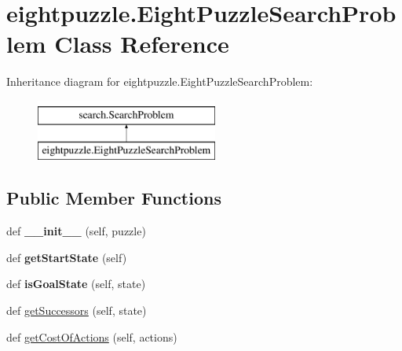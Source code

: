 \hypertarget{classeightpuzzle_1_1_eight_puzzle_search_problem}{}\section{eightpuzzle.\+Eight\+Puzzle\+Search\+Problem Class Reference}
\label{classeightpuzzle_1_1_eight_puzzle_search_problem}
Inheritance diagram for eightpuzzle.\+Eight\+Puzzle\+Search\+Problem\+:\begin{figure}[H]
\begin{center}
\leavevmode
\includegraphics[height=2.000000cm]{classeightpuzzle_1_1_eight_puzzle_search_problem}
\end{center}
\end{figure}
\subsection*{Public Member Functions}
\begin{DoxyCompactItemize}
\item 
\mbox{\label{classeightpuzzle_1_1_eight_puzzle_search_problem_ae8bb59255259b3571f333e448c1ec097}} 
def {\bfseries \+\_\+\+\_\+init\+\_\+\+\_\+} (self, puzzle)
\item 
\mbox{\label{classeightpuzzle_1_1_eight_puzzle_search_problem_ac291c65dbf03a5c060b5a34c04e922bc}} 
def {\bfseries get\+Start\+State} (self)
\item 
\mbox{\label{classeightpuzzle_1_1_eight_puzzle_search_problem_a9679f43fd8503aaf20c101ecc66bd2ba}} 
def {\bfseries is\+Goal\+State} (self, state)
\item 
def \hyperlink{classeightpuzzle_1_1_eight_puzzle_search_problem_ac33cc3422f9a66bc0270ce43a79cf7c9}{get\+Successors} (self, state)
\item 
def \hyperlink{classeightpuzzle_1_1_eight_puzzle_search_problem_ac2a259f6cf252108fb8560345f788614}{get\+Cost\+Of\+Actions} (self, actions)
\end{DoxyCompactItemize}
